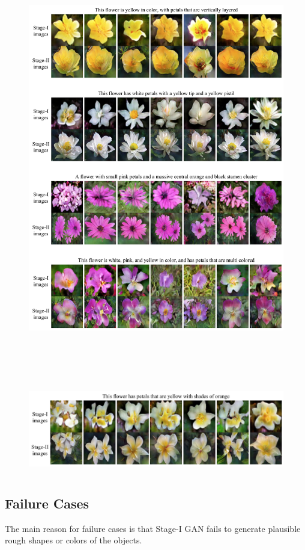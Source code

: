 \documentclass[a4paper,12pt,oneside]{article}
\begin{document}
    \begin{figure}[H]
      \centering
      \includegraphics[height=18cm,width=15cm]{Figure11.png}
      \end{figure}

      \begin{figure}[H]
        \centering
        \includegraphics[height=4cm,width=15cm]{Figure12.png}
        \end{figure}

        \subsection{Failure Cases}
        The main reason for failure cases is that Stage-I GAN fails to generate plausible rough shapes or colors of the objects.
\end{document}
